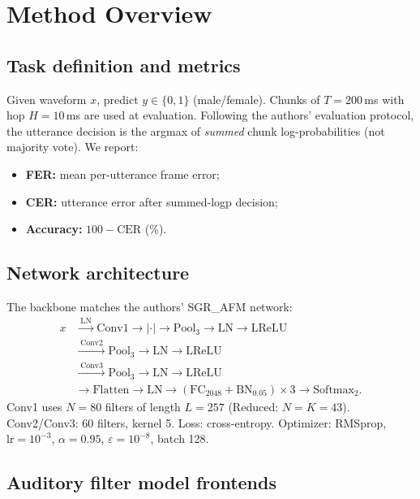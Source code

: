 \documentclass[11pt,a4paper]{article}
\begin{document}
\section{Method Overview}

\subsection{Task definition and metrics}

Given waveform $x$, predict $y\in\{0,1\}$ (male/female). Chunks of $T{=}200$\,ms with hop $H{=}10$\,ms are used at evaluation. Following the authors' evaluation protocol, the utterance decision is the argmax of \emph{summed} chunk log-probabilities (not majority vote). We report:
\begin{itemize}[leftmargin=1.6em,itemsep=0.2em]
  \item \textbf{FER:} mean per-utterance frame error;
  \item \textbf{CER:} utterance error after summed-logp decision;
  \item \textbf{Accuracy:} $100-\mathrm{CER}$ (\%).
\end{itemize}

\subsection{Network architecture}

The backbone matches the authors' SGR\_AFM network:
\begin{align*}
  x &\xrightarrow{\;\mathrm{LN}\;} \mathrm{Conv1}\to \lvert\cdot\rvert \to \mathrm{Pool}_3 \to \mathrm{LN} \to \mathrm{LReLU}\\
    &\xrightarrow{\;\mathrm{Conv2}\;} \mathrm{Pool}_3 \to \mathrm{LN} \to \mathrm{LReLU}\\
    &\xrightarrow{\;\mathrm{Conv3}\;} \mathrm{Pool}_3 \to \mathrm{LN} \to \mathrm{LReLU}\\
    &\to \mathrm{Flatten} \to \mathrm{LN} \to (\mathrm{FC}_{2048}+\mathrm{BN}_{0.05})\times 3 \to \mathrm{Softmax}_2.
\end{align*}
Conv1 uses $N{=}80$ filters of length $L{=}257$ (Reduced: $N{=}K{=}43$). Conv2/Conv3: 60 filters, kernel 5. Loss: cross-entropy. Optimizer: RMSprop, $\mathrm{lr}{=}10^{-3}$, $\alpha{=}0.95$, $\varepsilon{=}10^{-8}$, batch 128.

\subsection{Auditory filter model frontends}
\end{document}
